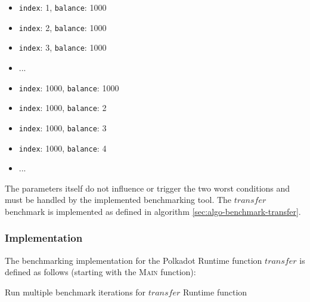 \documentclass[11pt,a4paper]{article}
\begin{document}
\begin{itemize}
  \item \verb|index|: 1, \verb|balance|: 1000
  \item \verb|index|: 2, \verb|balance|: 1000
  \item \verb|index|: 3, \verb|balance|: 1000
  \item ...
  \item \verb|index|: 1000, \verb|balance|: 1000
  \item \verb|index|: 1000, \verb|balance|: 2
  \item \verb|index|: 1000, \verb|balance|: 3
  \item \verb|index|: 1000, \verb|balance|: 4
  \item ...
\end{itemize}

The parameters itself do not influence or trigger the two worst conditions and
must be handled by the implemented benchmarking tool. The $transfer$ benchmark
is implemented as defined in algorithm \ref{sec:algo-benchmark-transfer}.

\subsubsection*{Implementation}
The benchmarking implementation for the Polkadot Runtime function $transfer$ is
defined as follows (starting with the \textsc{Main} function):
\newline

  

\begin{algorithm}[H]\label{sec:algo-benchmark-transfer}
  \caption{Run multiple benchmark iterations for $transfer$ Runtime function}
  \SetAlgoLined {} \BlankLine {} \BlankLine {}
\end{algorithm}
\end{document}

